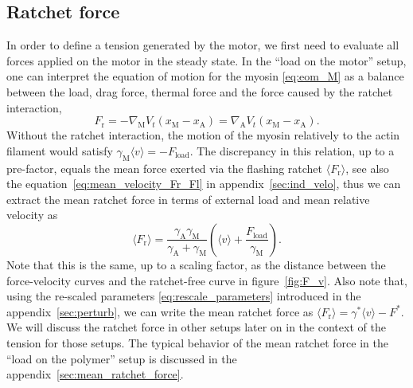 \documentclass[aps,pre,twocolumn,showpacs,showkeys,superscriptaddress,floatfix]{revtex4-1}
\begin{document}
\subsection{Ratchet force} 
In order to define a tension generated by the motor, we first need to evaluate all forces applied on the motor in the steady state. 
In the ``load on the motor'' setup, 
one can interpret the equation of motion for the myosin \eqref{eq:eom_M} as a balance between the load, drag force, thermal force and the force caused by the ratchet interaction, 
\begin{equation}
F_\text{r} = - \nabla_\text{M} V_t( x_\text{M} - x_\text{A} ) = \nabla_\text{A} V_t(x_\text{M} - x_\text{A} ) . 
\label{eq:ratchet_force}
\end{equation}
Without the ratchet interaction, the motion of the myosin relatively to the actin filament would satisfy $ \gamma_\text{M}\langle v \rangle = -F_\text{load}$. 
The discrepancy in this relation, up to a pre-factor, equals the mean force exerted via the flashing ratchet $\langle F_\text{r}\rangle$, 
see also the equation~\eqref{eq:mean_velocity_Fr_Fl} in appendix~\ref{sec:ind_velo},
thus we can extract the mean ratchet force in terms of external load and mean relative velocity as 
\begin{equation}
\langle F_\text{r} \rangle = \frac{\gamma_\text{A}\gamma_\text{M}}{\gamma_\text{A} + \gamma_\text{M} } \left(\langle v \rangle + \frac{F_\text{load}}{\gamma_\text{M}}\right) .
\label{eq:mean_ratchet_force}
\end{equation}
Note that this is the same, up to a scaling factor, as the distance between the force-velocity curves and the ratchet-free curve in figure~\ref{fig:F_v}. 
Also note that, using the re-scaled parameters \eqref{eq:rescale_parameters} introduced in the appendix~\ref{sec:perturb}, 
we can write the mean ratchet force as $\langle F_\text{r} \rangle = \gamma^* \langle v \rangle - F^*$.
We will discuss the ratchet force in other setups later on in the context of the tension for those setups.
The typical behavior of the mean ratchet force in the ``load on the polymer'' setup is discussed in the appendix~\ref{sec:mean_ratchet_force}.
\end{document}
